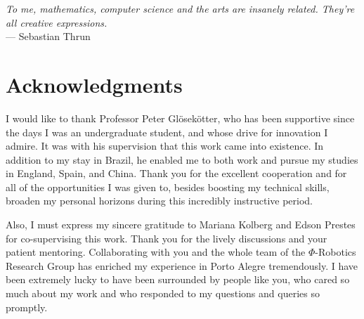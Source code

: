 

%

\begin{flushright}{\slshape    
    To me, mathematics, computer science and the arts are insanely related. They're all creative expressions.} \\ \medskip
    --- Sebastian Thrun
\end{flushright}

\bigskip

\begingroup
\let\clearpage\relax
\let\cleardoublepage\relax
\let\cleardoublepage\relax

\chapter*{Acknowledgments}

I would like to thank Professor Peter Glösekötter, who has been supportive since the days I was an undergraduate student, and whose drive for innovation I admire. It was with his supervision that this work came into existence. In addition to my stay in Brazil, he enabled me to both work and pursue my studies in England, Spain, and China. Thank you for the excellent cooperation and for all of the opportunities I was given to, besides boosting my technical skills, broaden my personal horizons during this incredibly instructive period.

Also, I must express my sincere gratitude to Mariana Kolberg and Edson Prestes for co-supervising this work. Thank you for the lively discussions and your patient mentoring. Collaborating with you and the whole team of the $\Phi$-Robotics Research Group has enriched my experience in Porto Alegre tremendously. I have been extremely lucky to have been surrounded by people like you, who cared so much about my work and who responded to my questions and queries so promptly. 

